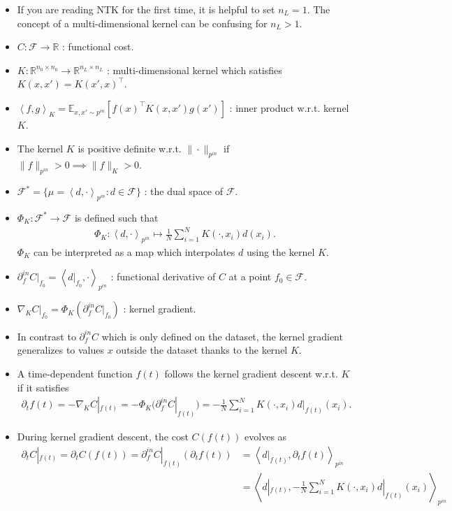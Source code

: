 \documentclass[10pt]{article}
\newcommand{\RR}{\mathbb{R}}
\newcommand{\EE}{\mathbb{E}}
\newcommand{\FF}{\mathcal{F}}
\newcommand{\inner}[2]{\left\langle #1, #2 \right\rangle}
\newcommand{\pin}{{p^{in}}}
\newcommand{\din}{\partial^{in}}
\begin{document}
\begin{itemize}
\item If you are reading NTK for the first time, it is helpful to set $n_L = 1$. The concept of a multi-dimensional kernel can be confusing for $n_L > 1$.
\item $C : \FF \rightarrow \RR$ : functional cost.
\item $K : \RR^{n_0 \times n_0} \rightarrow \RR^{n_L \times n_L}$ : multi-dimensional kernel which satisfies $K(x,x') = K(x',x)^\top$.
\item $\inner{f}{g}_K = \EE_{x,x' \sim \pin} [f(x)^\top K(x,x') g(x')]$ : inner product w.r.t. kernel $K$.
\item The kernel $K$ is positive definite w.r.t. $\|\cdot\|_{\pin}$ if $\|f\|_{\pin} > 0 \implies \|f\|_K > 0$.
\item $\FF^* = \{ \mu = \inner{d}{\cdot}_{\pin} : d \in \FF \}$ : the dual space of $\FF$.
\item $\Phi_K : \FF^* \rightarrow \FF$ is defined such that
\begin{align*}
\Phi_K : \inner{d}{\cdot}_{\pin} \mapsto \frac{1}{N} \sum_{i = 1}^N K(\cdot,x_i) d(x_i).
\end{align*}
$\Phi_K$ can be interpreted as a map which interpolates $d$ using the kernel $K$.
\item $\din_f C|_{f_0} = \inner{d|_{f_0}}{\cdot}_{\pin}$ : functional derivative of $C$ at a point $f_0 \in \FF$.
\item $\nabla_K C|_{f_0} = \Phi_K(\din_f C|_{f_0})$ : kernel gradient.
\item In contrast to $\din_f C$ which is only defined on the dataset, the kernel gradient generalizes to values $x$ outside the dataset thanks to the kernel $K$.
\item A time-dependent function $f(t)$ follows the kernel gradient descent w.r.t. $K$ if it satisfies
\begin{align*}
\partial_t f(t) = -\nabla_K C|_{f(t)} = - \Phi_K(\din_f C|_{f(t)}) = -\frac{1}{N} \sum_{i = 1}^N K(\cdot,x_i) d|_{f(t)}(x_i).
\end{align*}
\item During kernel gradient descent, the cost $C(f(t))$ evolves as
\begin{align*}
\partial_t C|_{f(t)} = \partial_t C(f(t)) = \din_f C|_{f(t)}(\partial_t f(t)) &= \inner{d|_{f(t)}}{\partial_t f(t)}_{\pin} \\
&= \inner{d|_{f(t)}}{-\frac{1}{N} \sum_{i = 1}^N K(\cdot,x_i) d|_{f(t)}(x_i)}_\pin \\

\end{align*}
\end{itemize}
\end{document}
